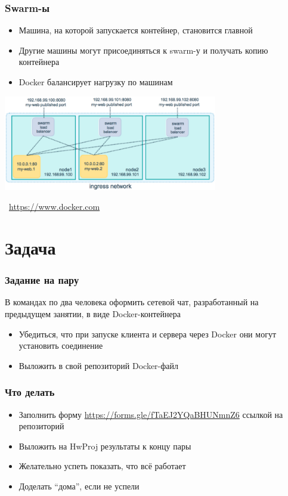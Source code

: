 \documentclass[xetex,mathserif,serif]{beamer}
\newcommand{\attribution}[1] {
    \vspace{-5mm}\begin{flushright}\begin{scriptsize}\textcolor{gray}{\textcopyright\, #1}\end{scriptsize}\end{flushright}
}
\begin{document}
    \begin{frame}
        \frametitle{Swarm-ы}
        \begin{itemize}
            \item Машина, на которой запускается контейнер, становится главной
            \item Другие машины могут присоединяться к swarm-у и получать копию контейнера
            \item Docker балансирует нагрузку по машинам
        \end{itemize}
        \begin{center}
            \includegraphics[width=0.7\textwidth]{swarmLoadBalancing.png}
            \attribution{\url{https://www.docker.com}}
        \end{center}
    \end{frame}

    \section{Задача}

    \begin{frame}
        \frametitle{Задание на пару}
        В командах по два человека оформить сетевой чат, разработанный на предыдущем занятии, в виде Docker-контейнера
        \begin{itemize}
            \item Убедиться, что при запуске клиента и сервера через Docker они могут установить соединение
            \item Выложить в свой репозиторий Docker-файл
        \end{itemize}
    \end{frame}

    \begin{frame}
        \frametitle{Что делать}
        \begin{itemize}
            \item Заполнить форму \url{https://forms.gle/fTaEJ2YQaBHUNmnZ6} ссылкой на репозиторий
            \item Выложить на HwProj результаты к концу пары
            \item Желательно успеть показать, что всё работает
            \item Доделать ``дома'', если не успели
        \end{itemize}
    \end{frame}
\end{document}
